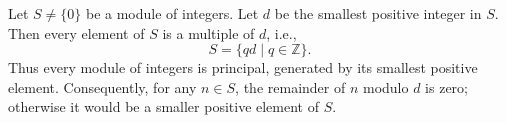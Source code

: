 Let $S \neq \{0\}$ be a module of integers. Let $d$ be the smallest positive integer in $S$. Then every element of $S$ is a multiple of $d$, i.e.,
$$S = \{ qd \mid q \in \mathbb{Z} \}.$$
Thus every module of integers is principal, generated by its smallest positive element. Consequently, for any $n \in S$, the remainder of $n$ modulo $d$ is zero; otherwise it would be a smaller positive element of $S$.
